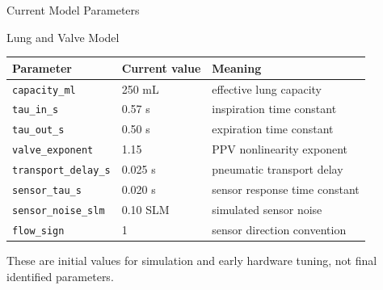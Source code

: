 \documentclass[aspectratio=169,10pt]{beamer}
\newcommand{\code}[1]{\texttt{\small #1}}
\begin{document}
\begin{frame}{Current Model Parameters}
  \centering
  \begin{block}{Lung and Valve Model}
    \begin{tabular}{lll}
      \toprule
      Parameter & Current value & Meaning \\
      \midrule
      \code{capacity\_ml} & 250 mL & effective lung capacity \\
      \code{tau\_in\_s} & 0.57 s & inspiration time constant \\
      \code{tau\_out\_s} & 0.50 s & expiration time constant \\
      \code{valve\_exponent} & 1.15 & PPV nonlinearity exponent \\
      \code{transport\_delay\_s} & 0.025 s & pneumatic transport delay \\
      \code{sensor\_tau\_s} & 0.020 s & sensor response time constant \\
      \code{sensor\_noise\_slm} & 0.10 SLM & simulated sensor noise \\
      \code{flow\_sign} & 1 & sensor direction convention \\
      \bottomrule
    \end{tabular}
  \end{block}

  \vspace{0.4em}
  \small These are initial values for simulation and early hardware tuning, not final identified parameters.
\end{frame}
\end{document}
